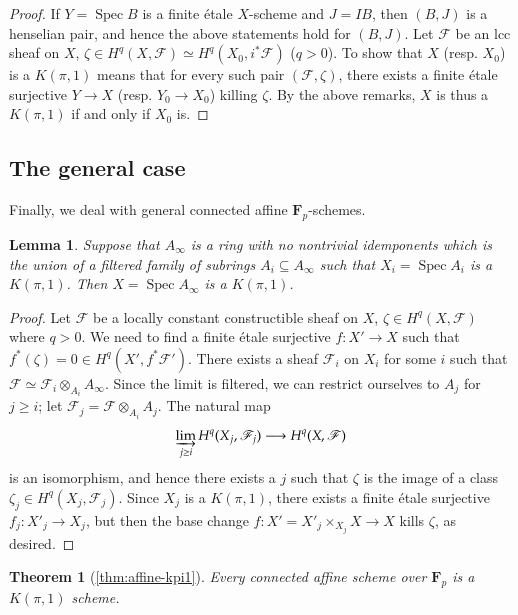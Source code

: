 \documentclass[twoside]{amsart}
\newcommand{\FF}{\mathbf{F}}
\newcommand{\Ff}{\mathscr{F}}
\DeclareMathOperator{\Spec}{Spec}
\newcommand{\isom}{\simeq}
\renewcommand{\to}{\longrightarrow}
\theoremstyle{plain}
\newtheorem{lemma}[subsubsection]{Lemma}
\newtheorem*{theorem*}{Theorem}
\theoremstyle{definition}
\theoremstyle{remark}
\numberwithin{equation}{subsection}
\begin{document}
\begin{proof}
If $Y=\Spec B$ is a finite \'etale $X$-scheme and $J=IB$, then $(B, J)$ is a henselian pair, and hence the above statements hold for $(B, J)$. Let $\Ff$ be an lcc sheaf on $X$, $\zeta\in H^q(X, \Ff)\isom H^q(X_0, i^* \Ff)$ ($q>0$). To show that $X$ (resp. $X_0$) is a $K(\pi, 1)$ means that for every such pair $(\Ff, \zeta)$, there exists a finite \'etale surjective $Y\to X$ (resp. $Y_0\to X_0$) killing $\zeta$. By the above remarks, $X$ is thus a $K(\pi, 1)$ if and only if $X_0$ is.
\end{proof}

\subsection{The general case}
\label{ss:proof-affine-kpi1}

Finally, we deal with general connected affine $\FF_p$-schemes. 

\begin{lemma} \label{lemma:limit-kpi1}
	Suppose that $A_\infty$ is a ring with no nontrivial idemponents which is the union of a filtered family of subrings $A_i\subseteq A_\infty$ such that $X_i = \Spec A_i$ is a $K(\pi, 1)$. Then $X=\Spec A_\infty$ is a $K(\pi, 1)$.
\end{lemma}

\begin{proof}
Let $\Ff$ be a locally constant constructible sheaf on $X$, $\zeta\in H^q(X, \Ff)$ where $q>0$. We need to find a finite \'etale surjective $f\colon X'\to X$ such that $f^*(\zeta) = 0 \in H^q(X', f^*\Ff')$. There exists a sheaf $\Ff_i$ on $X_i$ for some $i$ such that $\Ff\isom \Ff_i\otimes_{A_i} A_\infty$. Since the limit is filtered, we can restrict ourselves to $A_j$ for $j\geq i$; let $\Ff_j = \Ff\otimes_{A_i} A_j$. The natural map
\[ 
	\varinjlim_{j\geq i} H^q(X_j, \Ff_j) \to H^q(X, \Ff)
\]
is an isomorphism, and hence there exists a $j$ such that $\zeta$ is the image of a class $\zeta_j\in H^q(X_j, \Ff_j)$. Since $X_j$ is a $K(\pi, 1)$, there exists a finite \'etale surjective $f_j \colon X'_j\to X_j$, but then the base change $f\colon X'=X'_j\times_{X_j} X\to X$ kills $\zeta$, as desired.
\end{proof}

\begin{theorem*}[\ref{thm:affine-kpi1}]
	Every connected affine scheme over $\FF_p$ is a $K(\pi, 1)$ scheme.
\end{theorem*}
\end{document}
